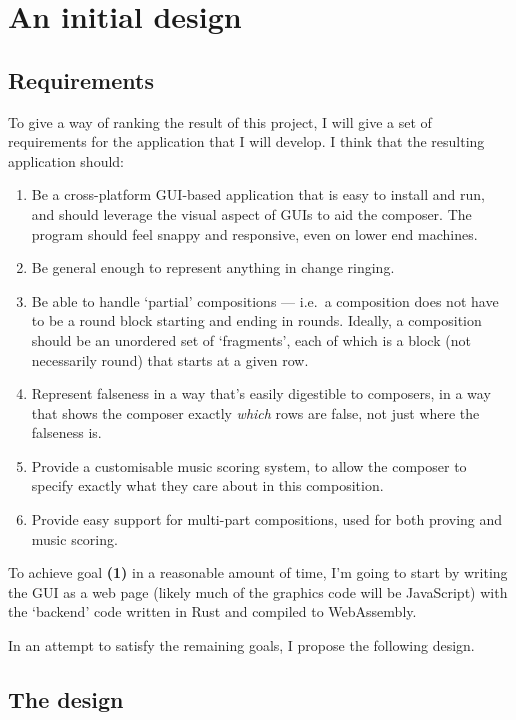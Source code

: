 \documentclass[12pt]{article}
\begin{document}
\section{An initial design}

\subsection{Requirements}

To give a way of ranking the result of this project, I will give a set of requirements for the
application that I will develop.  I think that the resulting application should:

\begin{enumerate}
    \item Be a cross-platform GUI-based application that is easy to install and run, and should
        leverage the visual aspect of GUIs to aid the composer.  The program should feel snappy and
        responsive, even on lower end machines.
    \item Be general enough to represent anything in change ringing.
    \item Be able to handle `partial' compositions --- i.e.\ a composition does not have to be a
        round block starting and ending in rounds.  Ideally, a composition should be an unordered
        set of `fragments', each of which is a block (not necessarily round) that starts at a given
        row.
    \item Represent falseness in a way that's easily digestible to composers, in a way that shows
        the composer exactly \emph{which} rows are false, not just where the falseness is.
    \item Provide a customisable music scoring system, to allow the composer to specify exactly what
        they care about in this composition.
    \item Provide easy support for multi-part compositions, used for both proving and music scoring.
\end{enumerate}

To achieve goal \textbf{(1)} in a reasonable amount of time, I'm going to start by writing the GUI
as a web page (likely much of the graphics code will be JavaScript) with the `backend' code written
in Rust and compiled to WebAssembly.

\bigskip

\noindent In an attempt to satisfy the remaining goals, I propose the following design.

\subsection{The design}
\end{document}
